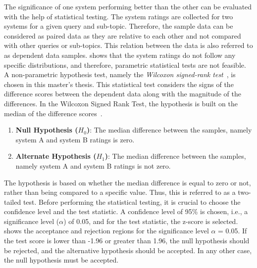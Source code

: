 The significance of one system performing better than the other can be evaluated with the help of statistical testing. The system ratings are collected for two systems for a given query and sub-topic. Therefore, the sample data can be considered as paired data as they are relative to each other and not compared with other queries or sub-topics. This relation between the data is also referred to as dependent data samples.  shows that the system ratings do not follow any specific distributions, and therefore, parametric statistical tests are not feasible. A non-parametric hypothesis test, namely the \emph{Wilcoxon signed-rank test}~\cite{buWilcoxonSigned}, is chosen in this master's thesis. This statistical test considers the signs of the difference scores between the dependent data along with the magnitude of the differences. In the Wilcoxon Signed Rank Test, the hypothesis is built on the median of the difference scores~\cite{buWilcoxonSigned, kaur2015comparative}.


\begin{enumerate}
	\item \textbf{Null Hypothesis ($H_0$)}: The median difference between the samples, namely system A and system B ratings is zero.
	
	\item \textbf{Alternate Hypothesis ($H_1$)}:  The median difference between the samples, namely system A and system B ratings is not zero.
\end{enumerate}

The hypothesis is based on whether the median difference is equal to zero or not, rather than being compared to a specific value. Thus, this is referred to as a two-tailed test. Before performing the statistical testing, it is crucial to choose the confidence level and the test statistic. A confidence level of 95\% is chosen, i.e., a significance level ($\alpha$) of 0.05, and for the test statistic, the z-score is selected.  shows the acceptance and rejection regions for the significance level $\alpha$ = 0.05. If the test score is lower than -1.96 or greater than 1.96, the null hypothesis should be rejected, and the alternative hypothesis should be accepted. In any other case, the null hypothesis must be accepted.


